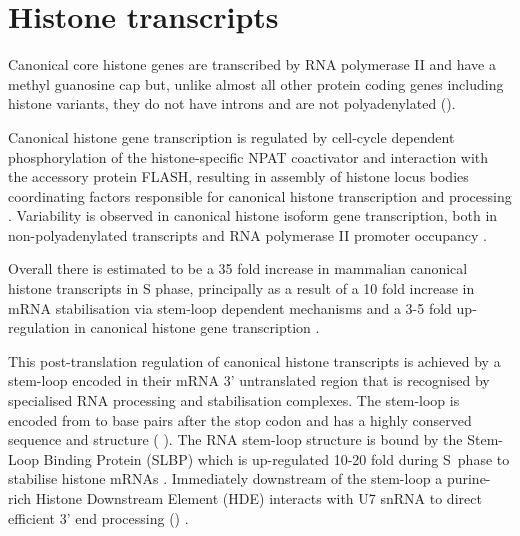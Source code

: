 \section{Histone transcripts}
  
	Canonical core histone genes are transcribed by RNA polymerase II 
	and have a methyl guanosine cap \citep{MarzluffNatRevGen2008}
	but, unlike almost all other protein coding genes including histone variants, 
	they do not have introns and are not polyadenylated ().

	Canonical histone gene transcription is regulated 
	by cell-cycle dependent phosphorylation of the histone-specific NPAT coactivator 
	and interaction with the accessory protein FLASH, 
	resulting in assembly of histone locus bodies 
	coordinating factors responsible for canonical histone transcription and processing \citep{MarzluffNatRevGen2008,RattrayMueller2012,Hoefig2014}.
	Variability is observed in canonical histone isoform gene transcription, 
	both in non-polyadenylated transcripts  and RNA polymerase II promoter occupancy \citep{Ederveen2011}.

	Overall there is estimated to be a 35 fold increase in mammalian canonical histone transcripts in S phase,
	principally as a result of a 10 fold increase in mRNA stabilisation via stem-loop dependent mechanisms 
	and a 3-5 fold up-regulation in canonical histone gene transcription \citep{HarrisMCB1991}.

	This post-translation regulation of canonical histone transcripts 
	is achieved by a stem-loop encoded in their mRNA 3' untranslated region 
	that is recognised by specialised RNA processing and stabilisation complexes.
	The stem-loop is encoded from \StemLoopStart{} to \StemLoopEnd{} base pairs after the stop codon 
	and has a highly conserved sequence and structure ( \citep{stem-loop-structure}).
	The RNA stem-loop structure is bound by the Stem-Loop Binding Protein (SLBP) 
	which is up-regulated 10-20 fold during S~phase to stabilise histone mRNAs \citep{SLBP-regulation}. 
	Immediately downstream of the stem-loop a purine-rich Histone Downstream Element (HDE) 
	interacts with U7 snRNA to direct efficient 3' end processing () \citep{HDE-sequence}.
  \begin{figure*}
    \centering
    \hfill
  \end{figure*}

